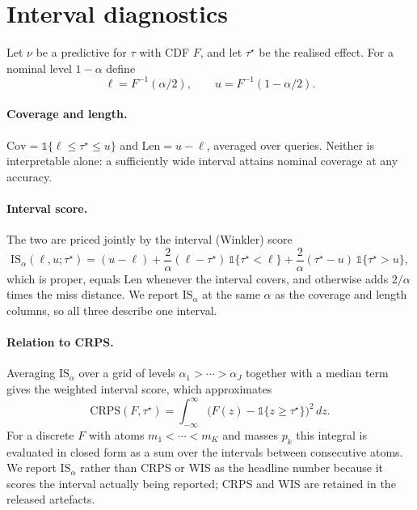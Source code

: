 \section{Interval diagnostics}
\label{app:metrics}

Let $\nu$ be a predictive for $\tau$ with CDF $F$, and let $\tau^\star$ be the
realised effect. For a nominal level $1-\alpha$ define
\begin{equation}
  \ell = F^{-1}(\alpha/2), \qquad u = F^{-1}(1-\alpha/2).
\end{equation}

\paragraph{Coverage and length.}
$\mathrm{Cov} = \mathbb{1}\{\ell \le \tau^\star \le u\}$ and
$\mathrm{Len} = u - \ell$, averaged over queries. Neither is interpretable
alone: a sufficiently wide interval attains nominal coverage at any accuracy.

\paragraph{Interval score.}
The two are priced jointly by the interval (Winkler) score
\begin{equation}
  \boxed{\;
  \mathrm{IS}_{\alpha}(\ell,u;\tau^\star)
  = (u - \ell)
  + \frac{2}{\alpha}(\ell - \tau^\star)\,\mathbb{1}\{\tau^\star < \ell\}
  + \frac{2}{\alpha}(\tau^\star - u)\,\mathbb{1}\{\tau^\star > u\} ,
  \;}
\end{equation}
which is proper, equals $\mathrm{Len}$ whenever the interval covers, and
otherwise adds $2/\alpha$ times the miss distance. We report
$\mathrm{IS}_{\alpha}$ at the same $\alpha$ as the coverage and length
columns, so all three describe one interval.

\paragraph{Relation to CRPS.}
Averaging $\mathrm{IS}_{\alpha}$ over a grid of levels
$\alpha_1 > \cdots > \alpha_J$ together with a median term gives the weighted
interval score, which approximates
\begin{equation}
  \mathrm{CRPS}(F, \tau^\star)
  = \int_{-\infty}^{\infty}\bigl(F(z) - \mathbb{1}\{z \ge \tau^\star\}\bigr)^2 \, dz .
\end{equation}
For a discrete $F$ with atoms $m_1 < \cdots < m_K$ and masses $p_k$ this
integral is evaluated in closed form as a sum over the intervals between
consecutive atoms. We report $\mathrm{IS}_{\alpha}$ rather than CRPS or WIS
as the headline number because it scores the interval actually being
reported; CRPS and WIS are retained in the released artefacts.

